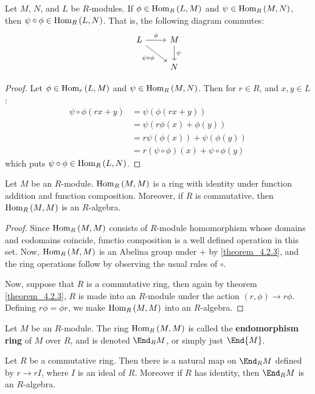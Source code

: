 \begin{theorem}\label{theorem_4.2.4}
  Let $M$, $N$, and $L$ be  $R$-modules. If  $\phi \in \operatorname{Hom}_R{(L,M)}$
  and $\psi \in \operatorname{Hom}_R{(M,N)}$, then $\psi \circ \phi \in
  \operatorname{Hom}_R{(L,N)}$. That is, the following diagram commutes:
  \[\begin{tikzcd}
    L & M \\
      & N
      \arrow["\phi", from=1-1, to=1-2]
      \arrow["{\psi \circ \phi}"', from=1-1, to=2-2]
      \arrow["\psi", from=1-2, to=2-2]
  \end{tikzcd}\]
\end{theorem}
\begin{proof}
  Let $\phi \in \operatorname{Hom}_r{(L,M)}$ and $\psi \in \operatorname{Hom}_R{(M,N)}$. Then for
  $r \in R$, and $x,y \in L$:
  \begin{align*}
    \psi \circ \phi(rx+y) &=  \psi(\phi(rx+y))  \\
      &=  \psi(r\phi(x)+\phi(y))  \\
      &=  r\psi(\phi(x))+\psi(\phi(y))  \\
      &= r(\psi \circ \phi)(x)+\psi \circ \phi(y)
  \end{align*}
  which puts $\psi \circ \phi \in \operatorname{Hom}_R{(L,N)}$.
\end{proof}

\begin{theorem}\label{theorem_4.2.5}
  Let $M$ be an  $R$-module.  $\operatorname{Hom}_R{(M,M)}$ is a ring with identity
  under function addition and function composition. Moreover, if $R$
  is commutative, then $\operatorname{Hom}_R{(M,M)}$ is an $R$-algebra.
\end{theorem}
\begin{proof}
  Since $\operatorname{Hom}_R{(M,M)}$ consists of $R$-module homomorphism whose
  domains and codomains coincide, functio composition is a well
  defined operation in this set. Now, $\operatorname{Hom}_R{(M,M)}$ is an Abelina
  group under $+$ by \ref{theorem_4.2.3}, and the ring operations
  follow by observing the usual rules of $\circ$.

  Now, suppose that $R$ is a commutative ring, then again by theorem
  \ref{theorem_4.2.3}, $R$ is made into an $R$-module under the action
  $(r,\phi) \xrightarrow{} r\phi$. Defining $r\phi=\phi r$, we make
  $\operatorname{Hom}_R{(M,M)}$ into an $R$-algebra.
\end{proof}

\begin{definition}
  Let $M$ be an  $R$-module. The ring  $\operatorname{Hom}_R{(M,M)}$ is called the
  \textbf{endomorphism ring} of $M$ over $R$, and is denoted
  $\End_R{M}$, or simply just $\End{M}$.
\end{definition}

\begin{proposition}\label{proposition_4.2.6}
  Let $R$ be a commutative ring. Then there is a natural map on
  $\End_R{M}$ defined by $r \xrightarrow{} rI$, where $I$ is an ideal
  of $R$. Moreover if $R$ has identity, then  $\End_R{M}$ is an
  $R$-algebra.
\end{proposition}
